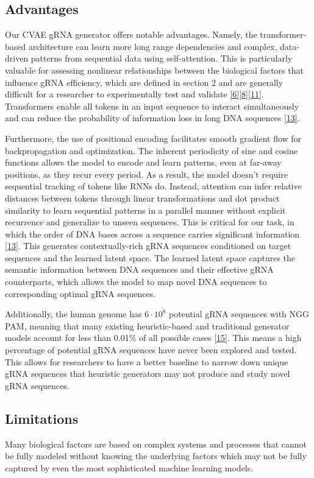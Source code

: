 \documentclass{article}
\begin{document}
\subsection{Advantages}
Our CVAE gRNA generator offers notable advantages. Namely, the transformer-based architecture can learn more long range dependencies and complex, data-driven patterns from sequential data using self-attention. This is particularly valuable for assessing nonlinear relationships between the biological factors that influence gRNA efficiency, which are defined in section 2 and are generally difficult for a researcher to experimentally test and validate \hyperref[Reference 6]{[6]}\hyperref[Reference 8]{[8]}\hyperref[Reference 11]{[11]}. Transformers enable all tokens in an input sequence to interact simultaneously and can reduce the probability of information loss in long DNA sequences \hyperref[Reference 13]{[13]}.

Furthermore, the use of positional encoding facilitates smooth gradient flow for backpropagation and optimization. The inherent periodicity of sine and cosine functions allows the model to encode and learn patterns, even at far-away positions, as they recur every period.  As a result, the model doesn't require sequential tracking of tokens like RNNs do. Instead, attention can infer relative distances between tokens through linear transformations and dot product similarity to learn sequential patterns in a parallel manner without explicit recurrence and generalize to unseen sequences. This is critical for our task, in which the order of DNA bases across a sequence carries significant information \hyperref[Reference 13]{[13]}. This generates contextually-rich gRNA sequences conditioned on target sequences and the learned latent space. The learned latent space captures the semantic information between DNA sequences and their effective gRNA counterparts, which allows the model to map novel DNA sequences to corresponding optimal gRNA sequences.

Additionally, the human genome has $6\cdot10^8$ potential gRNA sequences with NGG PAM, meaning that many existing heuristic-based and traditional generator models account for less than 0.01\% of all possible cases \hyperref[Reference 15]{[15]}. This means a high percentage of potential gRNA sequences have never been explored and tested. This allows for researchers to have a better baseline to narrow down unique gRNA sequences that heuristic generators may not produce and study novel gRNA sequences.


\subsection{Limitations}
Many biological factors are based on complex systems and processes that cannot be fully modeled without knowing the underlying factors which may not be fully captured by even the most sophisticated machine learning models. 
\end{document}
